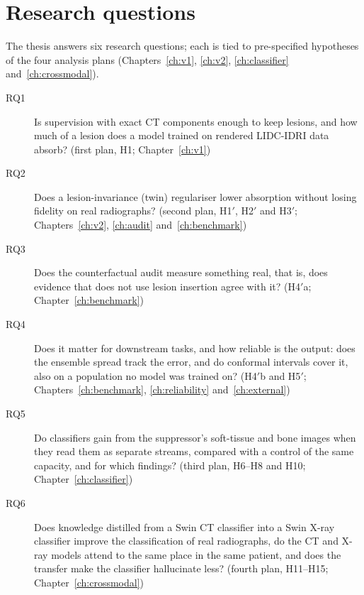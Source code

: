 \section{Research questions}
The thesis answers six research questions; each is tied to pre-specified hypotheses of the four analysis plans (Chapters~\ref{ch:v1},
\ref{ch:v2}, \ref{ch:classifier} and~\ref{ch:crossmodal}).
\begin{description}
\item[RQ1] Is supervision with exact CT components enough to keep lesions, and how much of a lesion does a model trained on rendered LIDC-IDRI
 data absorb? (first plan, H1; Chapter~\ref{ch:v1})
\item[RQ2] Does a lesion-invariance (twin) regulariser lower absorption without losing fidelity on real radiographs? (second plan, H1$'$, H2$'$
 and H3$'$; Chapters~\ref{ch:v2}, \ref{ch:audit} and~\ref{ch:benchmark})
\item[RQ3] Does the counterfactual audit measure something real, that is, does evidence that does not use lesion insertion agree with it?
 (H4$'$a; Chapter~\ref{ch:benchmark})
\item[RQ4] Does it matter for downstream tasks, and how reliable is the output: does the ensemble spread track the error, and do conformal
 intervals cover it, also on a population no model was trained on? (H4$'$b and H5$'$; Chapters~\ref{ch:benchmark}, \ref{ch:reliability}
 and~\ref{ch:external})
\item[RQ5] Do classifiers gain from the suppressor's soft-tissue and bone images when they read them as separate streams, compared with a
 control of the same capacity, and for which findings? (third plan, H6--H8 and H10; Chapter~\ref{ch:classifier})
\item[RQ6] Does knowledge distilled from a Swin CT classifier into a Swin X-ray classifier improve the classification of real radiographs,
 do the CT and X-ray models attend to the same place in the same patient, and does the transfer make the classifier hallucinate less?
 (fourth plan, H11--H15; Chapter~\ref{ch:crossmodal})
\end{description}

